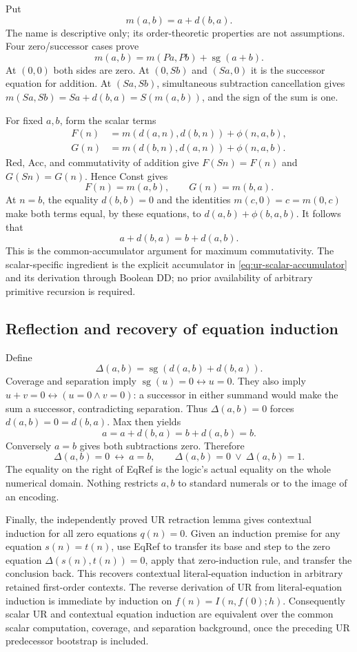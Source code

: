 Put
\[
                              m(a,b)=a+d(b,a).
\]
The name is descriptive only; its order-theoretic properties are not
assumptions. Four zero/successor cases prove
\[
                  m(a,b)=m(Pa,Pb)+\operatorname{sg}(a+b).
 \tag{Red}\label{eq:ur-max-diagonal-reduction}
\]
At $(0,0)$ both sides are zero. At $(0,Sb)$ and $(Sa,0)$ it is the
successor equation for addition. At $(Sa,Sb)$, simultaneous subtraction
cancellation gives
$m(Sa,Sb)=Sa+d(b,a)=S(m(a,b))$, and the sign of the sum is one.

For fixed $a,b$, form the scalar terms
\begin{align*}
 F(n)&=m(d(a,n),d(b,n))+\phi(n,a,b),\\
 G(n)&=m(d(b,n),d(a,n))+\phi(n,a,b).
\end{align*}
Red, Acc, and commutativity of addition give $F(Sn)=F(n)$ and
$G(Sn)=G(n)$. Hence Const gives
\[
                          F(n)=m(a,b),\qquad G(n)=m(b,a).
\]
At $n=b$, the equality $d(b,b)=0$ and the identities
$m(c,0)=c=m(0,c)$ make both terms equal, by these equations, to
$d(a,b)+\phi(b,a,b)$. It follows that
\[
                    \boxed{\ a+d(b,a)=b+d(a,b).\ }       \tag{Max}
\]
This is the common-accumulator argument for maximum commutativity.
The scalar-specific ingredient is the explicit accumulator in
\eqref{eq:ur-scalar-accumulator} and its derivation through Boolean DD;
no prior availability of arbitrary primitive recursion is required.

\subsection{Reflection and recovery of equation induction}

Define
\[
                       \Delta(a,b)=\operatorname{sg}(d(a,b)+d(b,a)).
\]
Coverage and separation imply $\operatorname{sg}(u)=0\leftrightarrow u=0$.
They also imply $u+v=0\leftrightarrow(u=0\land v=0)$: a successor
in either summand would make the sum a successor, contradicting separation.
Thus $\Delta(a,b)=0$ forces $d(a,b)=0=d(b,a)$. Max then yields
\[
               a=a+d(b,a)=b+d(a,b)=b.
\]
Conversely $a=b$ gives both subtractions zero. Therefore
\[
 \boxed{\quad \Delta(a,b)=0\ \longleftrightarrow\ a=b,\qquad
                  \Delta(a,b)=0\ \lor\ \Delta(a,b)=1.\quad}
 \tag{EqRef}
\]
The equality on the right of EqRef is the logic's actual equality on
the whole numerical domain. Nothing restricts $a,b$ to standard numerals
or to the image of an encoding.

Finally, the independently proved UR retraction lemma gives contextual
induction for all zero equations $q(n)=0$. Given an induction premise
for any equation $s(n)=t(n)$, use EqRef to transfer its base and step
to the zero equation $\Delta(s(n),t(n))=0$, apply that zero-induction
rule, and transfer the conclusion back. This recovers contextual
literal-equation induction in arbitrary retained first-order contexts.
The reverse derivation of UR from literal-equation induction is immediate
by induction on $f(n)=I(n,f(0);h)$. Consequently scalar UR and contextual
equation induction are equivalent over the common scalar computation,
coverage, and separation background, once the preceding UR predecessor
bootstrap is included.
